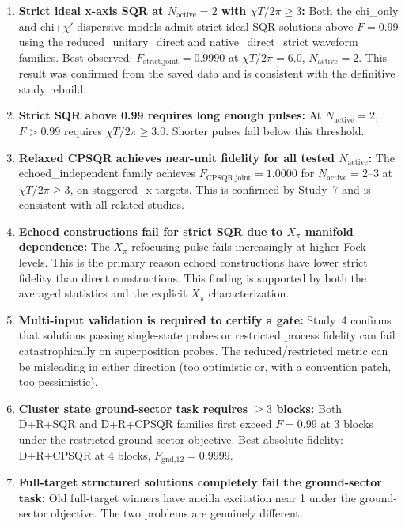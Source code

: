 \documentclass[11pt,letterpaper]{article}
\newcommand{\chiT}{\chi T / 2\pi}
\newcommand{\nact}{N_{\text{active}}}
\begin{document}
\begin{enumerate}
\item \textbf{Strict ideal x-axis SQR at $\nact = 2$ with $\chiT \ge 3$:}
  Both the chi\_only and chi+$\chi'$ dispersive models admit strict ideal SQR
  solutions above $F = 0.99$ using the reduced\_unitary\_direct and
  native\_direct\_strict waveform families.
  Best observed: $F_\text{strict,joint} = 0.9990$ at $\chiT = 6.0$, $\nact = 2$.
  This result was confirmed from the saved data and is consistent with the
  definitive study rebuild.

\item \textbf{Strict SQR above 0.99 requires long enough pulses:}
  At $\nact = 2$, $F > 0.99$ requires $\chiT \ge 3.0$.  Shorter pulses fall below
  this threshold.

\item \textbf{Relaxed CPSQR achieves near-unit fidelity for all tested $\nact$:}
  The echoed\_independent family achieves $F_\text{CPSQR,joint} = 1.0000$ for
  $\nact = 2$--$3$ at $\chiT \ge 3$, on staggered\_x targets.
  This is confirmed by Study~7 and is consistent with all related studies.

\item \textbf{Echoed constructions fail for strict SQR due to $X_\pi$ manifold dependence:}
  The $X_\pi$ refocusing pulse fails increasingly at higher Fock levels.
  This is the primary reason echoed constructions have lower strict fidelity
  than direct constructions.  This finding is supported by both the
  averaged statistics and the explicit $X_\pi$ characterization.

\item \textbf{Multi-input validation is required to certify a gate:}
  Study~4 confirms that solutions passing single-state probes or restricted
  process fidelity can fail catastrophically on superposition probes.
  The reduced/restricted metric can be misleading in either direction
  (too optimistic or, with a convention patch, too pessimistic).

\item \textbf{Cluster state ground-sector task requires $\ge 3$ blocks:}
  Both D+R+SQR and D+R+CPSQR families first exceed $F = 0.99$ at 3 blocks
  under the restricted ground-sector objective.
  Best absolute fidelity: D+R+CPSQR at 4 blocks, $F_\text{gnd,12} = 0.9999$.

\item \textbf{Full-target structured solutions completely fail the ground-sector task:}
  Old full-target winners have ancilla excitation near 1 under the ground-sector
  objective.  The two problems are genuinely different.
\end{enumerate}
\end{document}
